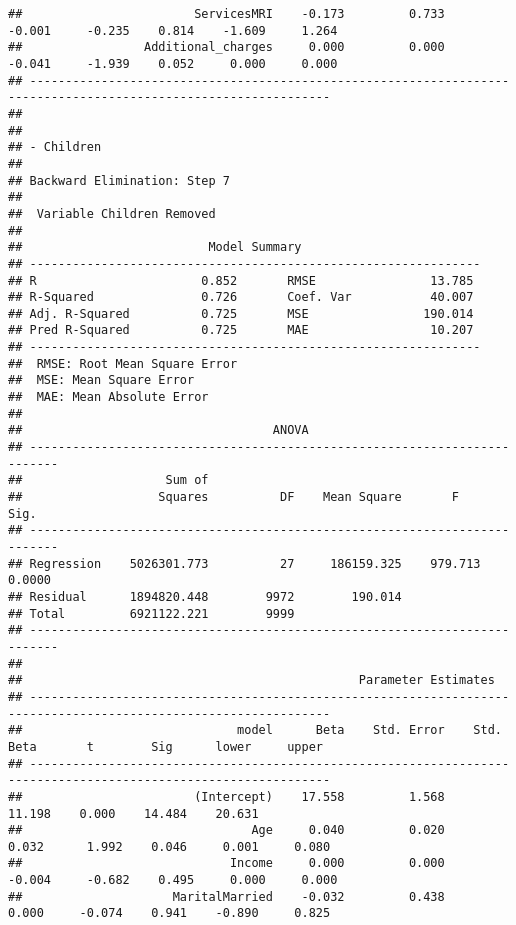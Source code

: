 \documentclass[
]{article}
\begin{document}
\begin{verbatim}
##                        ServicesMRI    -0.173         0.733       -0.001     -0.235    0.814    -1.609     1.264 
##                 Additional_charges     0.000         0.000       -0.041     -1.939    0.052     0.000     0.000 
## ----------------------------------------------------------------------------------------------------------------
## 
## 
## - Children 
## 
## Backward Elimination: Step 7 
## 
##  Variable Children Removed 
## 
##                          Model Summary                          
## ---------------------------------------------------------------
## R                       0.852       RMSE                13.785 
## R-Squared               0.726       Coef. Var           40.007 
## Adj. R-Squared          0.725       MSE                190.014 
## Pred R-Squared          0.725       MAE                 10.207 
## ---------------------------------------------------------------
##  RMSE: Root Mean Square Error 
##  MSE: Mean Square Error 
##  MAE: Mean Absolute Error 
## 
##                                   ANOVA                                    
## --------------------------------------------------------------------------
##                    Sum of                                                 
##                   Squares          DF    Mean Square       F         Sig. 
## --------------------------------------------------------------------------
## Regression    5026301.773          27     186159.325    979.713    0.0000 
## Residual      1894820.448        9972        190.014                      
## Total         6921122.221        9999                                     
## --------------------------------------------------------------------------
## 
##                                               Parameter Estimates                                                
## ----------------------------------------------------------------------------------------------------------------
##                              model      Beta    Std. Error    Std. Beta       t        Sig      lower     upper 
## ----------------------------------------------------------------------------------------------------------------
##                        (Intercept)    17.558         1.568                  11.198    0.000    14.484    20.631 
##                                Age     0.040         0.020        0.032      1.992    0.046     0.001     0.080 
##                             Income     0.000         0.000       -0.004     -0.682    0.495     0.000     0.000 
##                     MaritalMarried    -0.032         0.438        0.000     -0.074    0.941    -0.890     0.825 

\end{verbatim}
\end{document}
